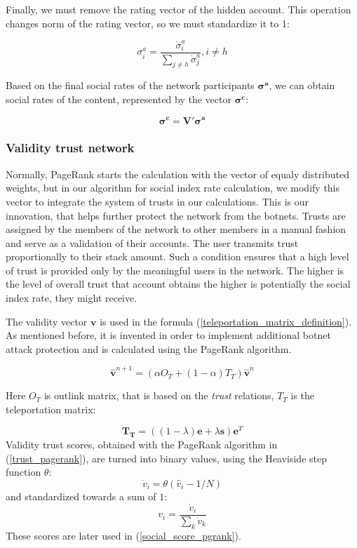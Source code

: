\documentclass[a4paper,12pt]{article}
\begin{document}
	Finally, we must remove the rating vector of the hidden account. This operation changes norm of the rating vector, so we must standardize it to 1:
	
	$$
	\sigma^a_i = \frac{\dot{\sigma}^a_i}{\sum_{j \ne h} \dot{\sigma}^a_j}, i \ne h
	$$
	
	
	Based on the final social rates of the network participants $\boldsymbol{\sigma^a}$, we can obtain social rates of the content, represented by the vector $\boldsymbol{\sigma^c}$:
	
	$$
	\boldsymbol{\sigma^c} = \boldsymbol{V'}\boldsymbol{\sigma^a}
	$$
	
\subsubsection{Validity trust network}

	Normally, PageRank starts the calculation with the vector of equaly distributed weights, but in our algorithm for social index rate calculation, we modify this vector to integrate the system of trusts in our calculations. This is our innovation, that helps further protect the network from the botnets. Trusts are assigned by the members of the network to other members in a manual fashion and serve as a validation of their accounts. The user transmits trust proportionally to their stack amount. Such a condition ensures that a high level of trust is provided only by the meaningful users in the network. The higher is the level of overall trust that account obtains the higher is potentially the social index rate, they might receive.
	
The validity vector $\boldsymbol{v}$ is used in the formula (\ref{teleportation_matrix_definition}). As mentioned before, it is invented in order to implement additional botnet attack protection and is calculated using the PageRank algorithm.
	
	\begin{equation}
	\label{trust_pagerank}
	\boldsymbol{\hat{v}}^{n+1} = (\alpha O_T+(1-\alpha)T_T) \boldsymbol{\hat{v}}^{n}
	\end{equation}
	
	Here $O_T$ is outlink matrix, that is based on the \textit{trust} relations, $T_T$ is the teleportation matrix:
	
	$$
        \boldsymbol{T_T} = ((1 - \lambda) \boldsymbol{e} + \lambda \boldsymbol{s}) \boldsymbol{e}^T
	$$
	Validity trust scores, obtained with the PageRank algorithm in (\ref{trust_pagerank}), are turned into binary values, using the Heaviside step function $\theta$:
	$$
	\dot{v}_i = \theta({\hat{v}_i}-1/N)
	$$
and standardized towards a sum of $1$:
	$$
	v_i = \frac{\dot{v}_i}{\sum_k{\dot{v}_k}}
	$$
	These scores are later used in (\ref{social_score_pgrank}).
\end{document}

